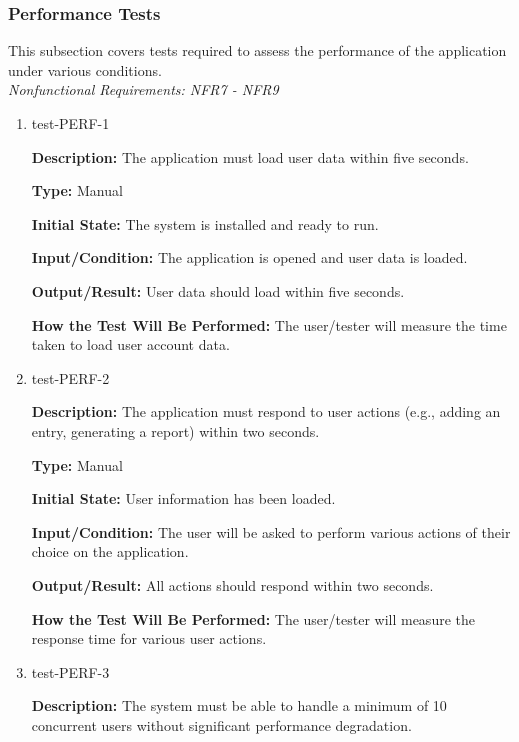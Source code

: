 \documentclass[12pt, titlepage]{article}
\begin{document}
\subsubsection{Performance Tests}

This subsection covers tests required to assess the performance of the application under various conditions.\\
\textit{Nonfunctional Requirements: NFR7 - NFR9}

\begin{enumerate}

\item{test-PERF-1\\}

\textbf{Description:} The application must load user data within five seconds.

\textbf{Type:} Manual
					
\textbf{Initial State:} The system is installed and ready to run.
					
\textbf{Input/Condition:} The application is opened and user data is loaded.
					
\textbf{Output/Result:} User data should load within five seconds.
					
\textbf{How the Test Will Be Performed:} The user/tester will measure the time
taken to load user account data.

\item{test-PERF-2\\}

\textbf{Description:} The application must respond to user actions (e.g., adding
an entry, generating a report) within two seconds.

\textbf{Type:} Manual
					
\textbf{Initial State:} User information has been loaded.
					
\textbf{Input/Condition:} The user will be asked to perform various actions of
their choice on the application.
					
\textbf{Output/Result:} All actions should respond within two seconds.
					
\textbf{How the Test Will Be Performed:} The user/tester will measure the
response time for various user actions.


\item{test-PERF-3\\}

\textbf{Description:} The system must be able to handle a minimum of 10
concurrent users without significant performance degradation.


\end{enumerate}
\end{document}
